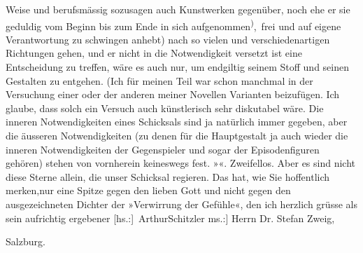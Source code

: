                Weise und berufsmässig sozusagen auch Kunstwerken gegenüber, noch ehe er sie geduldig
                   vom Beginn bis zum Ende in sich aufgenommen\substVorne{}\textsuperscript{)}\substDazwischen{},\substHinten{} frei und auf eigene Verantwortung zu schwingen anhebt) nach so vielen und
               verschiedenartigen {\pb}Richtungen gehen, und er nicht in die
               Notwendigkeit versetzt ist eine Entscheidung zu treffen, wäre es auch nur, um
               endgiltig seinem Stoff und seinen Gestalten zu entgehen. (Ich für meinen Teil war
               schon manchmal in der Versuchung einer oder der anderen meiner Novellen Varianten
               beizufügen. Ich glaube, dass so\introOben{}lch\introOben{} ein Versuch auch künstlerisch sehr diskutabel
               wäre. Die inneren Notwendigkeiten eines Schicksals sind ja natürlich immer gegeben,
               aber die äusseren Notwendigkeiten (zu denen für die Hauptgestalt ja auch wieder die
               inneren Notwendigkeiten der Gegenspieler und sogar der Episodenfiguren gehören)
               stehen von vornherein keineswegs fest. »\label{K_L03747-2v}\label{K_L03747-2}«. Zweifellos. Aber es sind nicht diese Sterne allein, die unser Schicksal
               regieren. \strikeout{(}Das hat, wie Sie hoffentlich merken,nur eine Spitze gegen den lieben Gott
               und nicht gegen den ausgezeichneten Dichter der »Verwirrung der Gefühle«, den ich herzlich grüsse als sein aufrichtig
               ergebener\pend
           \pstart \spacefill\mbox{{[}hs.:{]} ArthurSchitzler}\pend{}
\pstart
           \noindent{}{[}ms.:{]} Herrn Dr. Stefan Zweig,\pend
           
\pstart
           Salzburg.\pend
           \endnumbering{}
\begin{anhang}
\end{anhang}
      
